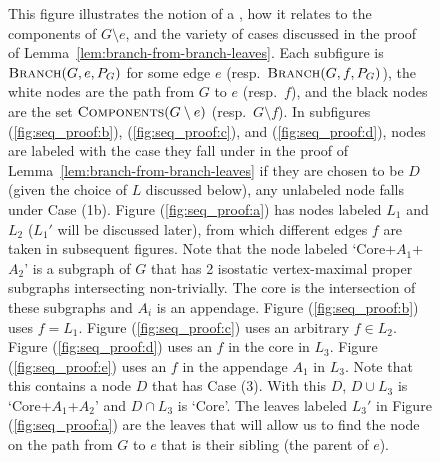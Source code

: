 \begin{figure}
    \caption{
    This figure illustrates the notion of a \branch, how it relates to the components of $G\setminus e$, and the variety of cases discussed in the proof of Lemma~\ref{lem:branch-from-branch-leaves}. Each subfigure is $\textsc{Branch}(G,e,P_G)$ for some edge $e$ (resp.\ $\textsc{Branch}(G,f,P_G)$), the white nodes are the path from $G$ to $e$ (resp.\ $f$), and the black nodes are the set $\textsc{Components}(G\setminus e)$ (resp.\ $G\setminus f$). In subfigures (\ref{fig:seq_proof:b}), (\ref{fig:seq_proof:c}), and (\ref{fig:seq_proof:d}), nodes are labeled with the case they fall under in the proof of Lemma~\ref{lem:branch-from-branch-leaves} if they are chosen to be $D$ (given the choice of $L$ discussed below), any unlabeled node falls under Case (1b).
    Figure (\ref{fig:seq_proof:a}) has nodes labeled $L_1$ and $L_2$ ($L_1'$ will be discussed later), from which different edges $f$ are taken in subsequent figures. Note that the node labeled `Core+$A_1$+$A_2$' is a subgraph of $G$ that has 2 isostatic vertex-maximal proper subgraphs intersecting non-trivially. The core is the intersection of these subgraphs and $A_i$ is an appendage.
    Figure (\ref{fig:seq_proof:b}) uses $f=L_1$.
    Figure (\ref{fig:seq_proof:c}) uses an arbitrary $f\in L_2$.
    Figure (\ref{fig:seq_proof:d}) uses an $f$ in the core in $L_3$.
    Figure (\ref{fig:seq_proof:e}) uses an $f$ in the appendage $A_1$ in $L_3$. Note that this contains a node $D$ that has Case (3). With this $D$, $D\cup L_3$ is `Core+$A_1$+$A_2$' and $D\cap L_3$ is `Core'. The leaves labeled $L_3'$ in Figure (\ref{fig:seq_proof:a}) are the leaves that will allow us to find the node on the path from $G$ to $e$ that is their sibling (the parent of $e$).
}
\end{figure}
